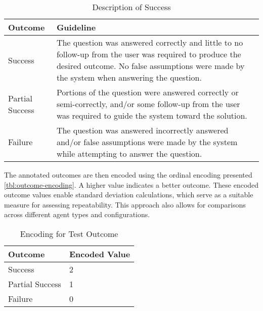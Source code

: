 \begin{table}[htbp]
    \centering
    \caption{Description of Success}
    \label{tbl:test-outcome-enum}
    \begin{tabularx}{0.9\textwidth}{p{3cm}X}
        \toprule
        \textbf{Outcome} & \textbf{Guideline}                                                                                                                                                                                  \\
        \midrule
        Success          & The question was answered correctly and little to no follow-up from the user was required to produce the desired outcome. No false assumptions were made by the system when answering the question. \\
        Partial Success  & Portions of the question were answered correctly or semi-correctly, and/or some follow-up from the user was required to guide the system toward the solution.                                       \\
        Failure          & The question was answered incorrectly answered and/or false assumptions were made by the system while attempting to answer the question.                                                            \\
        \bottomrule
    \end{tabularx}
\end{table}

The annotated outcomes are then encoded using the ordinal encoding presented \autoref{tbl:outcome-encoding}. A higher value indicates a better outcome. These encoded outcome values enable standard deviation calculations, which serve as a suitable measure for assessing repeatability. This approach also allows for comparisons across different agent types and configurations.

\begin{table}[htbp]
    \centering
    \caption{Encoding for Test Outcome}
    \label{tbl:outcome-encoding}
    \begin{tabularx}{0.5\textwidth}{XX}
        \toprule
        \textbf{Outcome} & \textbf{Encoded Value} \\
        \midrule
        Success          & 2                      \\
        Partial Success  & 1                      \\
        Failure          & 0                      \\
        \bottomrule
    \end{tabularx}
\end{table}


